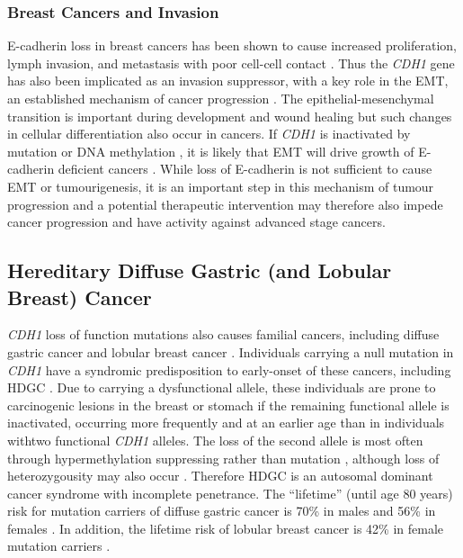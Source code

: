 \subsubsection{Breast Cancers and Invasion}
\gls{E-cadherin} loss in breast cancers has been shown to cause increased proliferation, lymph  invasion, and metastasis with poor cell-cell contact \cite{Berx2009}. Thus the \textit{CDH1} gene has also been implicated as an invasion suppressor, with a key role in the \gls{EMT}, an established mechanism of cancer progression \citep{Hanahan2011}. The epithelial-mesenchymal transition is important during development and wound healing but such changes in cellular differentiation also occur in cancers. If \textit{CDH1} is inactivated by \gls{mutation} or \acrshort{DNA} methylation \citep{Berx1996,Guilford1999,Machado2001}, it is likely that \gls{EMT} will drive growth of \gls{E-cadherin} deficient cancers \citep{Berx2009,Graziano2003,Polyak2009}. While loss of \gls{E-cadherin} is not sufficient to cause \gls{EMT} or tumourigenesis, it is an important step in this mechanism of tumour progression and a potential therapeutic intervention may therefore also impede cancer progression and have activity against advanced stage cancers.

\subsection{Hereditary Diffuse Gastric (and Lobular Breast) Cancer}


\textit{CDH1} loss of function \glspl{mutation} also causes \gls{familial} cancers, including diffuse gastric cancer and lobular breast cancer \citep{HDGC,Graziano2003,Guilford2010,Oliveira2009}. Individuals carrying a null \gls{mutation} in \textit{CDH1} have a syndromic predisposition to early-onset of these cancers, including \gls{HDGC} \citep{Guilford1998}. Due to carrying a dysfunctional \gls{allele}, these individuals are prone to carcinogenic lesions in the breast or stomach if the remaining functional \gls{allele} is inactivated, occurring more frequently and at an earlier age than in individuals withtwo functional \textit{CDH1} \glspl{allele}. The loss of the second \gls{allele} is most often through hypermethylation suppressing  rather than \gls{mutation} \citep{Grady2000, Graziano2003, Oliveira2009, Machado2001}, although loss of heterozygousity may also occur \citep{Guilford2010}. Therefore \gls{HDGC} is an autosomal dominant cancer syndrome with incomplete penetrance. The ``lifetime'' (until age 80 years) risk for \gls{mutation} carriers  of diffuse gastric cancer is 70\% in males and 56\% in females \citep{Hansford2015,vanderPost2015}. In addition, the lifetime risk of lobular breast cancer is 42\% in female \gls{mutation} carriers \citep{Hansford2015}.   

